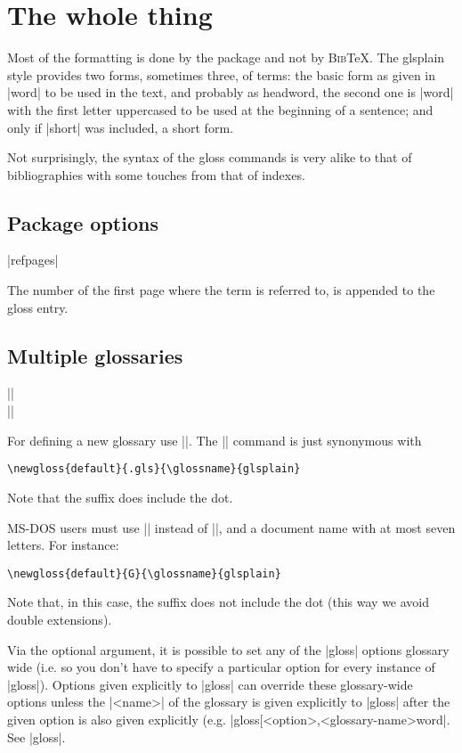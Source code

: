 \documentclass{ltxguide}
\newcommand{\gloss}{\textsf{gloss}}
\newcommand{\bibTeX}{\textsc{Bib}\TeX}
\begin{document}
\section{The whole thing}

Most of the formatting is done by the package and not by \bibTeX. The 
\textsf{glsplain} style provides two forms, sometimes three, of 
terms: the basic form as given in |word| to be used in the text, 
and probably as headword, the second one is |word| with the first 
letter uppercased to be used at the beginning of a sentence; and only 
if |short| was included, a short form.

Not surprisingly, the syntax of the \gloss{} commands is very
alike to that of bibliographies with some touches from that
of indexes.

\subsection{Package options}

\begin{decl}
|refpages|
\end{decl}

The number of the first page where the term is referred to, is
appended to the gloss entry.

\subsection{Multiple glossaries}

\begin{decl}
|\makegloss|\\
||
\end{decl}

For defining a new glossary use |\newgloss|. The |\makegloss|
command is just synonymous with
\begin{verbatim}
\newgloss{default}{.gls}{\glossname}{glsplain}
\end{verbatim}
Note that the suffix does include the dot.

MS-DOS users must use |\newgloss| instead of |\makegloss|, and
a document name with at most seven letters. For instance:
\begin{verbatim}
\newgloss{default}{G}{\glossname}{glsplain}
\end{verbatim}
Note that, in this case, the suffix does not include the dot
(this way we avoid double extensions).

Via the optional argument, it is possible to set any of the |\gloss| options
glossary wide (i.e. so you don't have to specify a particular option for every
instance of |\gloss|).  Options given explicitly to |\gloss| can override
these glossary-wide options unless the |<name>| of the glossary is given
explicitly to |\gloss| after the given option is also given explicitly (e.g.
|\gloss[<option>,<glossary-name>{word}|.  See |\gloss|. 
\end{document}
